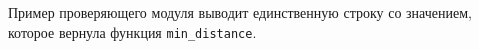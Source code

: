 Пример проверяющего модуля выводит единственную строку со значением,
которое вернула функция \texttt{min\_distance}.
